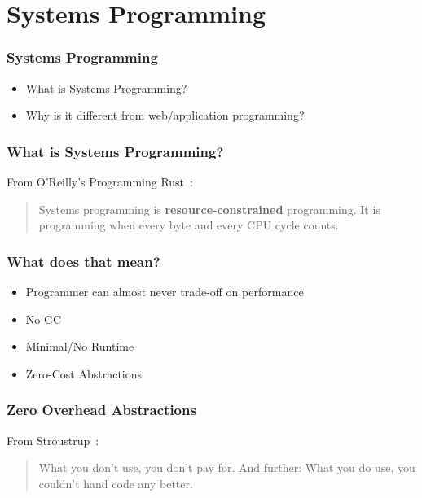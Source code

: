 \section{Systems Programming}
\label{sec:systems-programming}

\begin{frame}
  \frametitle{Systems Programming}
  \begin{itemize}
  \item What is Systems Programming?
  \item Why is it different from web/application programming?
  \end{itemize}
\end{frame}

\begin{frame}
  \frametitle{What is Systems Programming?}
  \begin{block}{From O'Reilly's Programming Rust~\cite{ProgRustPreface1}:}
    \begin{quotation}
      Systems programming is \textbf{resource-constrained}
      programming. It is programming when every byte and every CPU cycle
      counts.
    \end{quotation}
  \end{block}
\end{frame}

\begin{frame}
  \frametitle{What does that mean?}
  \begin{itemize}
  \item Programmer can almost never trade-off on performance
  \item No GC
  \item Minimal/No Runtime
  \item Zero-Cost Abstractions~\cite{Stroustrup}
  \end{itemize}
\end{frame}

\begin{frame}
  \frametitle{Zero Overhead Abstractions}
  \begin{block}{From Stroustrup~\cite{Stroustrup}:}
    \begin{quotation}
      What you don't use, you don't pay for. And further: What you do
      use, you couldn't hand code any better.
    \end{quotation}
  \end{block}
\end{frame}
